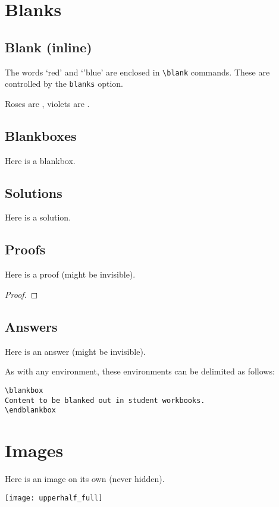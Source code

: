 \documentclass{article}
\theoremstyle{break}
\begin{document}
\section{Blanks}

\subsection{Blank (inline)}
The words `red' and `'blue' are enclosed in \verb+\blank+ commands. These are controlled by the \verb+blanks+ option.

Roses are , violets are .

\subsection{Blankboxes}
Here is a blankbox.
\begin{blankbox}
\lipsum[1]
\end{blankbox}

\subsection{Solutions}
Here is a solution.
\begin{solution}
\lipsum[2]
\end{solution}

\subsection{Proofs}
Here is a proof (might be invisible).
\begin{proof}
\lipsum[3]
\end{proof}

\subsection{Answers}
Here is an answer (might be invisible).
\begin{answer}
\lipsum[4]
\end{answer}


As with any environment, these environments can be delimited as follows:
\begin{verbatim}
\blankbox
Content to be blanked out in student workbooks.
\endblankbox
\end{verbatim}

\section{Images}
Here is an image on its own (never hidden).
\begin{center}
\texttt{[image: upperhalf\_full]}
\end{center}
\end{document}
